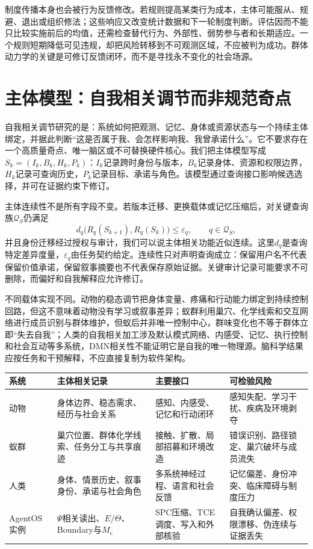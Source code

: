 制度传播本身也会被行为反馈修改。若规则提高某类行为成本，主体可能服从、规避、退出或组织修法；这些响应又改变统计数据和下一轮制度判断。评估因而不能只比较实施前后的均值，还需检查替代行为、外部性、弱势参与者和长期适应。一个规则短期降低可见违规，却把风险转移到不可观测区域，不应被判为成功。群体动力学的关键是可修订反馈闭环，而不是寻找永不变化的社会场源。

\section{主体模型：自我相关调节而非规范奇点}
\label{sec:physics_of_self_source}

自我相关调节研究的是：系统如何把观测、记忆、身体或资源状态与一个持续主体绑定，并据此判断“这是否属于我、会怎样影响我、我曾承诺什么”。它不要求存在一个高质量奇点、唯一脑区或不可替换硬件核心。我们把主体模型写成$S_k=(I_k,B_k,H_k,P_k)$：$I_k$记录跨时身份与版本，$B_k$记录身体、资源和权限边界，$H_k$记录可查询历史，$P_k$记录目标、承诺与角色。该模型通过查询接口影响候选选择，并可在证据约束下修订。

主体连续性不是所有字段不变。若版本迁移、更换载体或记忆压缩后，对关键查询族$\mathcal Q_S$仍满足
\[
d_q\bigl(R_q(S_{k+1}),R_q(S_k)\bigr)\le\varepsilon_q,
\qquad q\in\mathcal Q_S,
\]
并且身份迁移经过授权与审计，我们可以说主体相关功能近似连续。这里$d_q$是查询特定差异度量，$\varepsilon_q$由任务契约给定。连续性只对声明查询成立：保留用户名不代表保留价值承诺，保留叙事摘要也不代表保存原始证据。关键审计记录可能要求不可删除，而偏好和自我解释应允许修订。

不同载体实现不同。动物的稳态调节把身体变量、疼痛和行动能力绑定到持续控制回路，但这不意味着动物没有学习或叙事差异；蚁群利用巢穴、化学线索和交互网络进行成员识别与群体维护，但蚁后并非唯一控制中心，群味变化也不等于群体立即“失去自我”；人类的自我相关加工涉及默认模式网络、内感受、记忆、执行控制和社会互动等多系统，DMN相关性不能证明它是自我的唯一物理源。脑科学结果应按任务和干预解释，不应直接复制为软件架构。

\begin{table}[htbp]
\centering
\begin{tabularx}{\textwidth}{l X X X}
\toprule
\rowcolor{structurecolor!20} \textbf{系统} & \textbf{主体相关记录} & \textbf{主要接口} & \textbf{可检验风险} \\
\midrule
动物 & 身体边界、稳态需求、经历与社会关系 & 感知、内感受、记忆和行动闭环 & 感知失配、学习干扰、疾病及环境剥夺 \\
蚁群 & 巢穴位置、群体化学线索、任务分工与共享痕迹 & 接触、扩散、局部招募和环境改造 & 错误识别、路径锁定、巢穴破坏与成员流失 \\
人类 & 身体、情景历史、叙事身份、承诺与社会角色 & 多系统神经过程、语言和社会反馈 & 记忆偏差、身份冲突、临床障碍与制度压力 \\
AgentOS实例 & $\Psi$相关读出、$E/\Theta$、Boundary与$M_e$ & SPC压缩、TCE调度、写入和外部核验 & 自我确认偏差、权限漂移、伪连续与证据丢失 \\
\bottomrule
\end{tabularx}
\end{table}

